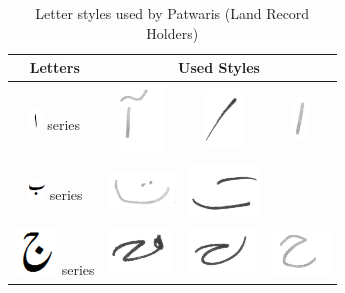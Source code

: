 \begin{table}[h]
\centering
\caption{Letter styles used by Patwaris (Land Record Holders)}\label{tab6-lro}
\begin{tabular}{@{}cccc@{}}
\hline
Letters	& \multicolumn{3}{c}{\textbf{Used Styles}} \\ \hline
\includegraphics[scale=0.50]{alif.png} series & \includegraphics[scale=0.25]{81} & \includegraphics[scale=0.25]{82}  & \includegraphics[scale=0.45]{83}  \\ 
\hline
\includegraphics[scale=0.50]{bay} series & \includegraphics[scale=0.20]{84} & \includegraphics[scale=0.20]{85}  &  \\
\hline
\includegraphics[scale=0.25]{jeeem} series & \includegraphics[scale=0.25]{86} & \includegraphics[scale=0.20]{87}  & \includegraphics[scale=0.15]{88} \\

\end{tabular}
\end{table}
